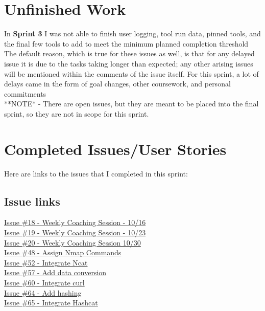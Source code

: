 \documentclass{article}
\begin{document}
\section{Unfinished Work}
\large{
In \textbf{Sprint 3} I was not able to finish user logging, tool run data, pinned tools, and the final few tools to add to meet the minimum planned completion threshold\\
The default reason, which is true for these issues as well, is that for any delayed issue it is due to the tasks taking longer than expected; any other arising issues will be mentioned within the comments of the issue itself. For this sprint, a lot of delays came in the form of goal changes, other coursework, and personal commitments \\
**NOTE* - There are open issues, but they are meant to be placed into the final sprint, so they are not in scope for this sprint. \\
}
\newpage
\section{Completed Issues/User Stories}
Here are links to the issues that I completed in this sprint:
\subsection{Issue links}

\href{https://github.com/zachA214/Adelson_Senior_Capstone/issues/18}{Issue \#18 - Weekly Coaching Session - 10/16} \\
\href{https://github.com/zachA214/Adelson_Senior_Capstone/issues/19}{Issue \#19 - Weekly Coaching Session - 10/23} \\
\href{https://github.com/zachA214/Adelson_Senior_Capstone/issues/20}{Issue \#20 - Weekly Coaching Session 10/30} \\
\href{https://github.com/zachA214/Adelson_Senior_Capstone/issues/48}{Issue \#48 - Assign Nmap Commands} \\
\href{https://github.com/zachA214/Adelson_Senior_Capstone/issues/52}{Issue \#52 - Integrate Ncat} \\
\href{https://github.com/zachA214/Adelson_Senior_Capstone/issues/57}{Issue \#57 - Add data conversion} \\
\href{https://github.com/zachA214/Adelson_Senior_Capstone/issues/60}{Issue \#60 - Integrate curl} \\
\href{https://github.com/zachA214/Adelson_Senior_Capstone/issues/64}{Issue \#64 - Add hashing} \\
\href{https://github.com/zachA214/Adelson_Senior_Capstone/issues/65}{Issue \#65 - Integrate Hashcat} \\
\end{document}
